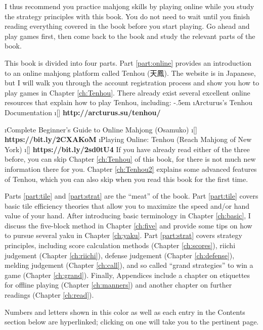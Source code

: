 \bigskip
I thus recommend you practice mahjong skills by playing online while you study the strategy principles with this book. You do not need to wait until you finish reading everything covered in the book before you start playing. Go ahead and play games first, then come back to the book and study the relevant parts of the book. 

\bigskip

This book is divided into four parts. Part \ref{part:online} provides an introduction to an online mahjong platform called {\jap Tenhou} (天鳳). The website is in Japanese, but I will walk you through the account registration process and show you how to play games in Chapter \ref{ch:Tenhou}. There already exist several excellent online resources that explain how to play {\jap Tenhou}, including:
\bi \itemsep-.5em
\i Arcturus's Tenhou Documentation
\vspace{-10pt} 
	\bi
	\i[] \textbf{http://arcturus.su/tenhou/}
	\ei
	
\i Complete Beginner's Guide to Online Mahjong (Osamuko)
\vspace{-10pt} 
	\bi
	\i[] \textbf{https://bit.ly/2CXAKoM}
	\ei
\i Playing Online: Tenhou (Reach Mahjong of New York)
	\bi \i[] \textbf{https://bit.ly/2sd0tU4} \ei
\ei
If you have already read either of the three before, you can skip Chapter \ref{ch:Tenhou} of this book, for there is not much new information there for you. Chapter \ref{ch:Tenhou2} explains some advanced features of {\jap Tenhou}, which you can also skip when you read this book for the first time.

\bigskip
Parts \ref{part:tile} and \ref{part:strat} are the ``meat'' of the book. 
Part \ref{part:tile} covers basic tile efficiency theories that allow you to maximize the speed and/or hand value of your hand. After introducing basic terminology in Chapter \ref{ch:basic}, I discuss the five-block method in Chapter \ref{ch:five} and provide some tips on how to pursue several {\jap yaku} in Chapter \ref{ch:yaku}. 
Part \ref{part:strat} covers strategy principles, including score calculation methods (Chapter \ref{ch:scores}), riichi judgement (Chapter \ref{ch:riichi}), defense judgement (Chapter \ref{ch:defense}), melding judgement (Chapter \ref{ch:call}), and so called ``grand strategies'' to win a game (Chapter \ref{ch:grand}). 
Finally, Appendices include a chapter on etiquettes for offline playing (Chapter \ref{ch:manners}) and another chapter on further readings (Chapter \ref{ch:read}). 

\bigskip
Numbers and letters shown {\color{MyBlue} in this color} as well as each entry in the Contents section below are hyperlinked; clicking on one will take you to the pertinent page. 

